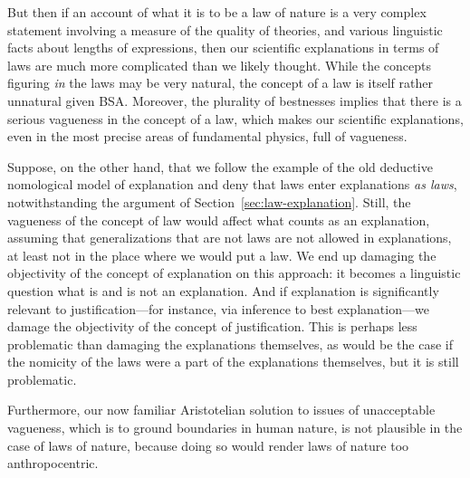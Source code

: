 But then if an account of what it is to be a law of nature is a very complex statement involving a measure
of the quality of theories, and various linguistic facts about lengths of expressions, then our scientific explanations in 
terms of laws are much more complicated than we likely thought. While the concepts figuring \textit{in} the laws may be very
natural, the concept of a law is itself rather unnatural given BSA. Moreover, the plurality of bestnesses implies that there is a serious
vagueness in the concept of a law, which makes our scientific explanations, even in the most precise areas of fundamental physics,
full of vagueness. 

Suppose, on the other hand, that we follow the example of the old deductive nomological model of explanation and deny that laws 
enter explanations \textit{as laws}, notwithstanding the argument of Section~\ref{sec:law-explanation}. Still, the vagueness of the concept of law would affect what counts as an explanation, assuming that generalizations that
are not laws are not allowed in explanations, at least not in the place where we would put a law. We end up damaging the
objectivity of the concept of explanation on this approach: it becomes a linguistic question what is and is not an explanation. 
And if explanation is significantly relevant to justification---for instance, via inference to best explanation---we damage the 
objectivity of the concept of justification. This is perhaps less problematic than damaging the explanations themselves, as would
be the case if the nomicity of the laws were a part of the explanations themselves, but it is still problematic.

Furthermore, our now familiar Aristotelian solution to issues of unacceptable vagueness, which is to ground boundaries in human nature, is not plausible in the case of laws of nature, because doing so would render laws of nature 
too anthropocentric. 

